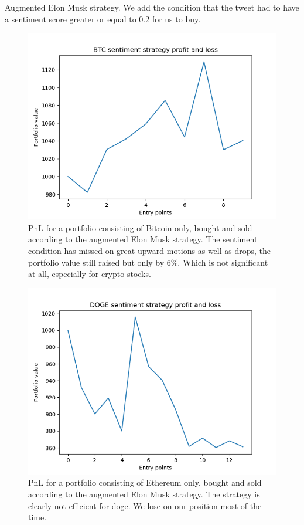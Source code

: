 \documentclass[twoside]{report}
\begin{document}
\begin{spacing}{1}
\vspace{-1.5em}
\begin{strategy}
Augmented Elon Musk strategy. We add the condition that the tweet had to have a sentiment score greater or equal to $0.2$ for us to buy.\end{strategy}\label{strat:sent} 
\begin{figure}[!htbp]
    \centering
    \includegraphics[scale = 0.5]{TestPlots/plot_sentiment_btc.png}
    \caption{PnL for a portfolio consisting of Bitcoin only, bought and sold according to the augmented Elon Musk strategy. The sentiment condition has missed on great upward motions as well as drops, the portfolio value still raised but only by 6\%. Which is not significant at all, especially for crypto stocks.}
    \label{fig:elon_sent_btc_pnl}
\end{figure}
\begin{figure}[!htbp]
    \centering
    \includegraphics[scale = 0.5]{TestPlots/Doge_sentiment_plot.png}
    \caption{PnL for a portfolio consisting of Ethereum only, bought and sold according to the augmented Elon Musk strategy. The strategy is clearly not efficient for doge. We lose on our position most of the time.}
    \label{fig:elon_sent_eth_pnl}
\end{figure}


\end{spacing}
\end{document}
